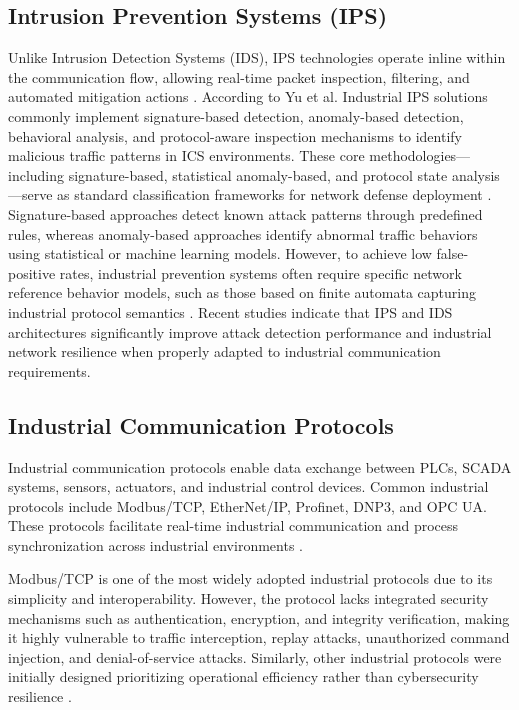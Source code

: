 \subsection{Intrusion Prevention Systems (IPS)}
Unlike Intrusion Detection Systems (IDS), IPS technologies operate inline within the communication flow, allowing real-time packet inspection, filtering, and automated mitigation actions \cite{Raman2021ICS}. According to Yu et al. \cite{Yu2019IDS} Industrial IPS solutions commonly implement signature-based detection, anomaly-based detection, behavioral analysis, and protocol-aware inspection mechanisms to identify malicious traffic patterns in ICS environments. These core methodologies—including signature-based, statistical anomaly-based, and protocol state analysis—serve as standard classification frameworks for network defense deployment \cite{Scarfone2007IDS}. Signature-based approaches detect known attack patterns through predefined rules, whereas anomaly-based approaches identify abnormal traffic behaviors using statistical or machine learning models. However, to achieve low false-positive rates, industrial prevention systems often require specific network reference behavior models, such as those based on finite automata capturing industrial protocol semantics \cite{Liao2013IDS}. Recent studies indicate that IPS and IDS architectures significantly improve attack detection performance and industrial network resilience when properly adapted to industrial communication requirements.

\subsection{Industrial Communication Protocols}
Industrial communication protocols enable data exchange between PLCs, SCADA systems, sensors, actuators, and industrial control devices. Common industrial protocols include Modbus/TCP, EtherNet/IP, Profinet, DNP3, and OPC UA. These protocols facilitate real-time industrial communication and process synchronization across industrial environments \cite{Pan2020PLC}.

Modbus/TCP is one of the most widely adopted industrial protocols due to its simplicity and interoperability. However, the protocol lacks integrated security mechanisms such as authentication, encryption, and integrity verification, making it highly vulnerable to traffic interception, replay attacks, unauthorized command injection, and denial-of-service attacks. Similarly, other industrial protocols were initially designed prioritizing operational efficiency rather than cybersecurity resilience \cite{Yu2019IDS}.

